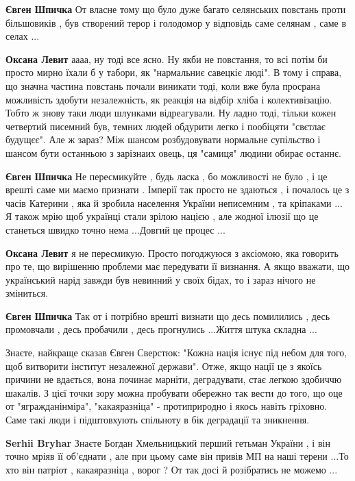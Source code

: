 \begin{itemize}
\begin{itemize}
\textbf{Євген Шпичка} От власне тому що було дуже багато селянських повстань проти більшовиків , був створений терор і голодомор у відповідь саме селянам , саме в селах ...

\textbf{Оксана Левит} аааа, ну тоді все ясно. Ну якби не повстання, то всі потім би просто мирно їхали б у табори, як "нармальниє савецкіє люді". В тому і справа, що значна частина повстань почали виникати тоді, коли вже була просрана можливість здобути незалежність, як реакція на відбір хліба і колективізацію. Тобто ж знову таки люди шлунками відреагували. Ну ладно тоді, тільки кожен четвертий писемний був, темних людей обдурити легко і пообіцяти "свєтлає будущєє". Але ж зараз? Між шансом розбудовувати нормальне супільство і шансом бути останньою з зарізнаих овець, ця "самиця" людини обирає останнє.

\textbf{Євген Шпичка} Не пересмикуйте , будь ласка , бо можливості не було , і це врешті саме ми маємо признати . Імперії так просто не здаються , і почалось це з часів Катерини , яка й зробила населення України неписемним , та кріпаками ... Я також мрію щоб українці стали зрілою нацією , але жодної ілюзії що це станеться швидко точно нема ...Довгий це процес ...

\textbf{Оксана Левит} я не пересмикую. Просто погоджуюся з аксіомою, яка говорить про те, що вирішенню проблеми має передувати її визнання. А якщо вважати, що український нарід завжди був невинний у своїх бідах, то і зараз нічого не зміниться.

\textbf{Євген Шпичка} Так от і потрібно врешті визнати що десь помилились , десь промовчали , десь пробачили , десь прогнулись ...Життя штука складна ...



Знаєте, найкраще сказав Євген Сверстюк: "Кожна нація існує під небом для того,
щоб витворити інститут незалежної держави". Отже, якщо нації це з якоїсь
причини не вдається, вона починає марніти, деградувати, стає легкою здобиччю
шакалів. З цієї точки зору можна пробувати обережно так вести до того, що оце
от "ягражданінміра", "какаяразніца" - протиприродно і якось навіть гріховно.
Саме такі люди і підштовхують спільноту в бік деградації та зникнення.

\textbf{Serhii Bryhar} Знаєте Богдан Хмельницький перший гетьман України , і він точно мріяв її об'єднати , але при цьому саме він привів МП на наші терени ...То хто він патріот , какаяразніца , ворог ? От так досі й розібратись не можемо ...


\end{itemize}
\end{itemize}
